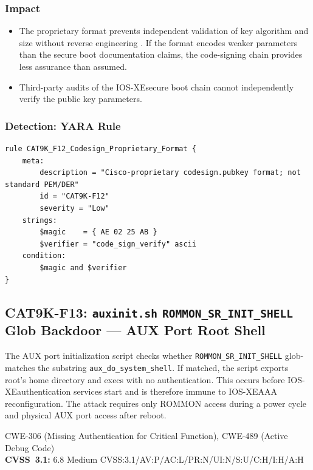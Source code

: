 \documentclass[11pt,a4paper]{article}
\begin{document}
\subsubsection{Impact}

\begin{itemize}[nosep]
  \item The proprietary format prevents independent validation of key algorithm and
    size without reverse engineering . If the format
    encodes weaker parameters than the secure boot documentation claims, the
    code-signing chain provides less assurance than assumed.
  \item Third-party audits of the IOS-XE\@ secure boot chain cannot independently
    verify the public key parameters.
\end{itemize}

\subsubsection{Detection: YARA Rule}

\begin{lstlisting}[style=yara]
rule CAT9K_F12_Codesign_Proprietary_Format {
    meta:
        description = "Cisco-proprietary codesign.pubkey format; not standard PEM/DER"
        id = "CAT9K-F12"
        severity = "Low"
    strings:
        $magic    = { AE 02 25 AB }
        $verifier = "code_sign_verify" ascii
    condition:
        $magic and $verifier
}
\end{lstlisting}

\subsection{CAT9K-F13: \texorpdfstring{\texttt{auxinit.sh}}{auxinit.sh} \texorpdfstring{\texttt{ROMMON\_SR\_INIT\_SHELL}}{ROMMON\_SR\_INIT\_SHELL} Glob Backdoor --- AUX Port Root Shell}

\begin{overviewbox}
The AUX port initialization script checks whether \texttt{ROMMON\_SR\_INIT\_SHELL}
glob-matches the substring \texttt{aux\_do\_system\_shell}. If matched, the script
exports root's home directory and execs  with no authentication.
This occurs before IOS-XE\@ authentication services start and is therefore immune to
IOS-XE\@ AAA reconfiguration. The attack requires only ROMMON access during a power
cycle and physical AUX port access after reboot.

CWE-306 (Missing Authentication for Critical Function), CWE-489 (Active Debug Code)\\
\textbf{CVSS~3.1:} 6.8 Medium \quad CVSS:3.1/AV:P/AC:L/PR:N/UI:N/S:U/C:H/I:H/A:H
\end{overviewbox}
\end{document}
